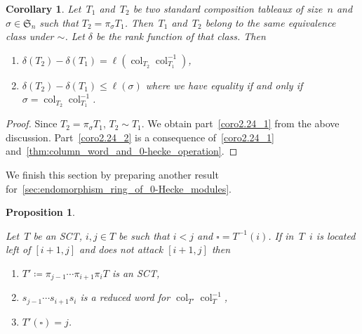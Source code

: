 \documentclass[10pt]{amsart}
\theoremstyle{plain}
\theoremstyle{plain}
\theoremstyle{plain}
\theoremstyle{plain}
\newtheorem{prop}[prop]{Proposition}
\theoremstyle{plain}
\newtheorem{coro}[coro]{Corollary}
\theoremstyle{definition}
\theoremstyle{definition}
\newcommand{\fS}{\mathfrak{S}}
\newcommand{\fs}{s}
\newcommand{\col}{\operatorname{col}}
\newcommand{\cell}{\square}
\begin{document}
\begin{coro}
	\label{thm:rank_in_E_and_column_word}
	Let~$T_1$ and~$T_2$ be two standard composition tableaux of size~$n$ and $\sigma \in \fS_n$ such that $T_2 = \pi_\sigma T_1$. Then~$T_1$ and~$T_2$ belong to the same equivalence class under $\sim$. Let $\delta$ be the rank function of that class. Then
	\begin{enumerate}
		\item\label{coro2.24_1} $\delta(T_2) - \delta(T_1) = \ell(\col_{T_2}\col^{-1}_{T_1})$,
		\item\label{coro2.24_2} $\delta(T_2) - \delta(T_1) \leq \ell(\sigma)$ where we have equality if and only if $\sigma = \col_{T_2}\col_{T_1}^{-1}$.
	\end{enumerate}
\end{coro}


\begin{proof} Since $T_2 = \pi_\sigma T_1$, $T_2 \sim T_1$.
We obtain part~\eqref{coro2.24_1} from the above discussion. Part~\eqref{coro2.24_2} is a consequence of~\eqref{coro2.24_1} and~\cref{thm:column_word_and_0-hecke_operation}.
\end{proof}

We finish this section by preparing another result for~\cref{sec:endomorphism_ring_of_0-Hecke_modules}.

\begin{prop}
	\label{thm:mutliple_flips_same_cell}
	
	Let~$T$ be an SCT, $i,j\in T$ be such that $i<j$ and $\cell = T^{-1}(i)$. If in~$T$~$i$ is located left of $[i+1,j]$
	and does not attack $[i+1,j]$ then 
	\begin{enumerate}	
		\item\label{prop2.25_1} $T'\coloneqq \pi_{j-1} \cdots \pi_{i+1}\pi_i T$ is an SCT,
		\item\label{prop2.25_2} $\fs_{j-1} \cdots \fs_{i+1}\fs_i$ is a reduced word for $\col_{T'}\col_T^{-1}$,
		\item\label{prop2.25_3} $T'(\cell)= j$.
	\end{enumerate}
\end{prop}
\end{document}
